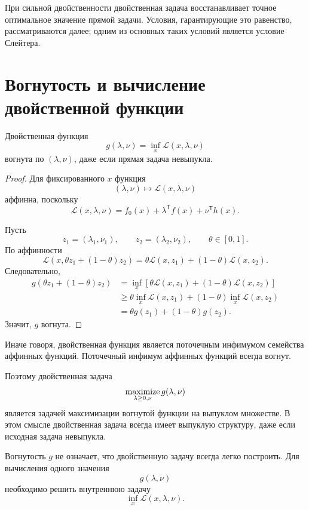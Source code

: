 При сильной двойственности двойственная задача восстанавливает
точное оптимальное значение прямой задачи. Условия, гарантирующие
это равенство, рассматриваются далее; одним из основных таких
условий является условие Слейтера.

\section{Вогнутость и вычисление двойственной функции}

\begin{theorem}
Двойственная функция
\[
    g(\lambda,\nu)
    =
    \inf_x\mathcal L(x,\lambda,\nu)
\]
вогнута по \((\lambda,\nu)\), даже если прямая задача невыпукла.
\end{theorem}

\begin{proof}
Для фиксированного \(x\) функция
\[
    (\lambda,\nu)
    \longmapsto
    \mathcal L(x,\lambda,\nu)
\]
аффинна, поскольку
\[
    \mathcal L(x,\lambda,\nu)
    =
    f_0(x)
    +
    \lambda^{\mathsf T}f(x)
    +
    \nu^{\mathsf T}h(x).
\]

Пусть
\[
    z_1=(\lambda_1,\nu_1),
    \qquad
    z_2=(\lambda_2,\nu_2),
    \qquad
    \theta\in[0,1].
\]
По аффинности
\[
    \mathcal L(x,\theta z_1+(1-\theta)z_2)
    =
    \theta\mathcal L(x,z_1)
    +
    (1-\theta)\mathcal L(x,z_2).
\]
Следовательно,
\[
\begin{aligned}
    g(\theta z_1+(1-\theta)z_2)
    &=
    \inf_x
    \left[
        \theta\mathcal L(x,z_1)
        +(1-\theta)\mathcal L(x,z_2)
    \right]
    \\
    &\ge
    \theta\inf_x\mathcal L(x,z_1)
    +
    (1-\theta)\inf_x\mathcal L(x,z_2)
    \\
    &=
    \theta g(z_1)+(1-\theta)g(z_2).
\end{aligned}
\]
Значит, \(g\) вогнута.
\end{proof}

Иначе говоря, двойственная функция является поточечным инфимумом
семейства аффинных функций. Поточечный инфимум аффинных функций
всегда вогнут.

Поэтому двойственная задача
\[
    \operatorname*{maximize}_{\lambda\ge0,\nu}g(\lambda,\nu)
\]
является задачей максимизации вогнутой функции на выпуклом
множестве. В этом смысле двойственная задача всегда имеет выпуклую
структуру, даже если исходная задача невыпукла.



Вогнутость \(g\) не означает, что двойственную задачу всегда легко
построить. Для вычисления одного значения
\[
    g(\lambda,\nu)
\]
необходимо решить внутреннюю задачу
\[
    \inf_x\mathcal L(x,\lambda,\nu).
\]

